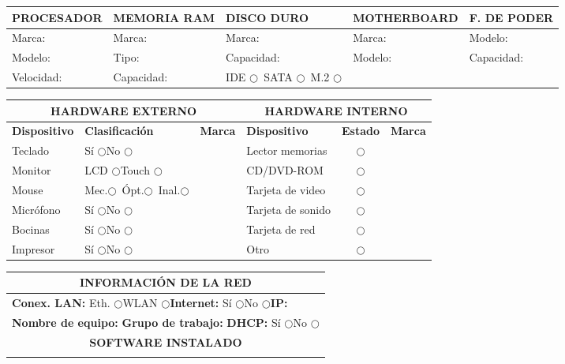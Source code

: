 \documentclass[10pt,letterpaper]{article}
\newcommand{\casilla}{$\bigcirc$}
\newcommand{\cabecera}[1]{\cellcolor{colorcabecera}\textcolor{colortextocabecera}{\textbf{#1}}}
\newcommand{\subcabecera}[1]{\cellcolor{colorfondoseccion}\textbf{#1}}
\begin{document}
\vspace{-1pt}
\noindent
\begin{tabularx}{\textwidth}{|X|X|X|X|X|}
\hline
\subcabecera{PROCESADOR} & \subcabecera{MEMORIA RAM} & \subcabecera{DISCO DURO} & \subcabecera{MOTHERBOARD} & \subcabecera{F. DE PODER} \\
\hline
Marca: & Marca: & Marca: & Marca: & Modelo: \\
Modelo: & Tipo: & Capacidad: & Modelo: & Capacidad: \\
Velocidad: & Capacidad: & IDE \casilla\ SATA \casilla\ M.2 \casilla & & \\
\hline
\end{tabularx}
\vspace{0.3cm}

\noindent
\begin{tabularx}{\textwidth}{|l|l|X|l|c|X|}
\hline
\multicolumn{3}{|c|}{\cabecera{HARDWARE EXTERNO}} & \multicolumn{3}{c|}{\cabecera{HARDWARE INTERNO}} \\
\hline
\textbf{Dispositivo} & \textbf{Clasificación} & \textbf{Marca} & \textbf{Dispositivo} & \textbf{Estado} & \textbf{Marca} \\
\hline
Teclado & Sí \casilla\quad No \casilla & & Lector memorias & \casilla & \\
Monitor & LCD \casilla\quad Touch \casilla & & CD/DVD-ROM & \casilla & \\
Mouse & Mec.\casilla\ Ópt.\casilla\ Inal.\casilla & & Tarjeta de video & \casilla & \\
Micrófono & Sí \casilla\quad No \casilla & & Tarjeta de sonido & \casilla & \\
Bocinas & Sí \casilla\quad No \casilla & & Tarjeta de red & \casilla & \\
Impresor & Sí \casilla\quad No \casilla & & Otro & \casilla & \\
\hline
\end{tabularx}
\vspace{0.3cm}

\noindent
\begin{tabularx}{\textwidth}{|X|}
\hline
\multicolumn{1}{|c|}{\cabecera{INFORMACIÓN DE LA RED}} \\
\hline
\textbf{Conex. LAN:} \quad Eth. \casilla \quad WLAN \casilla \hfill \textbf{Internet:} Sí \casilla \quad No \casilla \hfill \textbf{IP:} \dotfill \\
\textbf{Nombre de equipo:} \dotfill \hfill \textbf{Grupo de trabajo:} \dotfill \hfill \textbf{DHCP:} Sí \casilla \quad No \casilla \\
\hline
\multicolumn{1}{|c|}{\cabecera{SOFTWARE INSTALADO}} \\
\hline
\vspace{1cm} \\ %
\hline
\end{tabularx}
\vspace{0.3cm}
\end{document}
